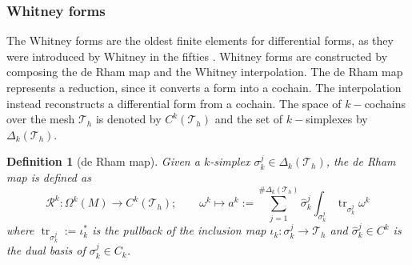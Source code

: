 \documentclass{elsarticle}
\newtheorem{definition}{Definition}
\DeclareMathOperator{\tr}{tr}
\newcommand*{\dual}[1]{\ensuremath{\widehat{#1}}}
\begin{document}
\subsubsection{Whitney forms}
The Whitney forms are the 
oldest finite elements for differential forms, as they were introduced by Whitney in the fifties \cite{whitney1957}. Whitney forms are constructed by composing the de Rham map and the Whitney interpolation. The de Rham map represents a reduction, since it converts a form into a cochain. The interpolation instead reconstructs a differential form from a cochain.  The space of $k-$cochains over the mesh $\mathcal{T}_h$ is denoted by $C^k(\mathcal{T}_h)$ and the set of $k-$simplexes by $\Delta_k(\mathcal{T}_h)$.

\begin{definition}[de Rham map]
Given a $k$-simplex $\sigma_k^j \in \Delta_k(\mathcal{T}_h)$, the de Rham map is defined as
\begin{equation*}
    \mathcal{R}^k:
\Omega^k(M) \rightarrow C^k(\mathcal{T}_h) ; \qquad \omega^k \mapsto  a^k:=
\sum_{j=1}^{\# \Delta_k(\mathcal{T}_h)}
\dual{\sigma}_k^j
 \int_{\sigma_k^j} \tr_{\sigma_k^j} \omega^k
\end{equation*}
where $\tr_{\sigma_k^j}:=\iota_k^*$ is the pullback of the inclusion map $\iota_k: \sigma_k^j \rightarrow \mathcal{T}_h$
and $\dual{\sigma}_k^j \in C^k$ is the dual basis of $\sigma_k^j \in C_k$.
\end{definition}
\end{document}
